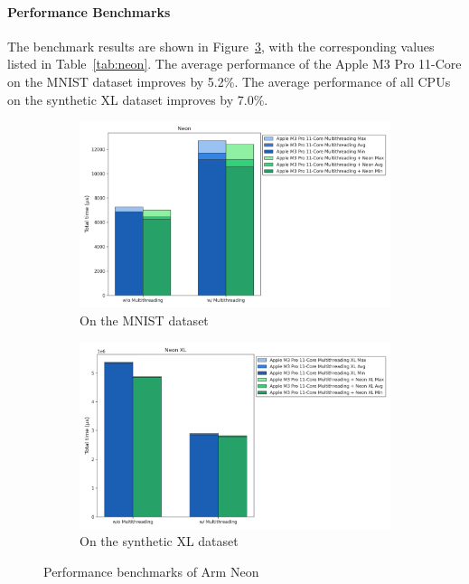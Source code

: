 \documentclass[modern,longauthor]{aastex7}
\begin{document}
\paragraph{Performance Benchmarks}
The benchmark results are shown in Figure~\ref{fig:neon}, with the corresponding values listed in Table~\ref{tab:neon}. The average performance of the Apple M3 Pro 11-Core on the MNIST dataset improves by 5.2\%. The average performance of all CPUs on the synthetic XL dataset improves by 7.0\%.

\begin{figure}[htb!]
\centering
\begin{subfigure}{.5\textwidth}
  \centering
  \includegraphics[width=\linewidth]{Graphs/Neon.png}
  \caption{On the MNIST dataset}
 \label{fig:neon_mnist}
\end{subfigure}%
\begin{subfigure}{.5\textwidth}
  \centering
  \includegraphics[width=\linewidth]{Graphs/Neon XL.png}
  \caption{On the synthetic XL dataset}
 \label{fig:neon_xl}
\end{subfigure}
\caption{Performance benchmarks of Arm Neon}
\label{fig:neon}
\end{figure}
\end{document}
